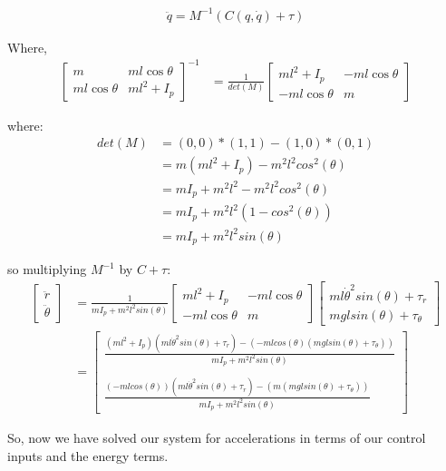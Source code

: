 \begin{align}
	\ddot{q} = M^{-1} (C(q,\dot{q}) + \tau)
\end{align}

Where,
\begin{align}
\begin{bmatrix}
	m & m l \cos\theta \\
	m l \cos\theta & m l^2 + I_p
\end{bmatrix}^{-1} &= \frac{1}{det(M)} 
\begin{bmatrix}
	ml^2 + I_p & -m l \cos\theta \\
	-m l \cos\theta & m
\end{bmatrix}
\end{align}

where:
\begin{align}
	det(M) &= (0,0)*(1,1) - (1,0)*(0,1) \\
	&= m(ml^2 + I_p) - m^2l^2cos^2(\theta) \\
	&= mI_p + m^2l^2 - m^2l^2cos^2(\theta) \\
	&= mI_p + m^2l^2(1 - cos^2(\theta)) \\
	&= mI_p + m^2l^2sin(\theta)
\end{align}

so multiplying $M^{-1}$ by $C + \tau$:
\begin{align}
	\begin{bmatrix}
		\ddot{r} \\
		\ddot{\theta}
	\end{bmatrix} &=
	\frac{1}{mI_p + m^2l^2sin(\theta)}
	\begin{bmatrix}
	ml^2 + I_p & -m l \cos\theta \\
-m l \cos\theta & m
	\end{bmatrix}
	\begin{bmatrix}
		ml\dot{\theta}^2sin(\theta) + \tau_r \\
		mglsin(\theta) + \tau_\theta
	\end{bmatrix} \\
	&= \begin{bmatrix}
		\frac{(ml^2 + I_p)(ml\dot{\theta}^2sin(\theta) + \tau_r) - (-mlcos(\theta)(mglsin(\theta) + \tau_\theta))}
		{mI_p + m^2l^2sin(\theta)} \\ \\
		\frac{(-mlcos(\theta))(ml\dot{\theta}^2sin(\theta) + \tau_r) - (m(mglsin(\theta) + \tau_\theta))}
		{mI_p + m^2l^2sin(\theta)}
	\end{bmatrix}
\end{align}

So, now we have solved our system for accelerations in terms of our control inputs and the energy terms.



